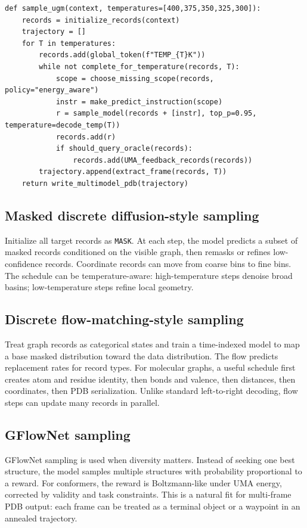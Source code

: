 \documentclass[11pt]{article}
\newcommand{\1}{\mathbf{1}}
\begin{document}
\begin{lstlisting}[caption={Annealed random-order sampler.}]
def sample_ugm(context, temperatures=[400,375,350,325,300]):
    records = initialize_records(context)
    trajectory = []
    for T in temperatures:
        records.add(global_token(f"TEMP_{T}K"))
        while not complete_for_temperature(records, T):
            scope = choose_missing_scope(records, policy="energy_aware")
            instr = make_predict_instruction(scope)
            r = sample_model(records + [instr], top_p=0.95, temperature=decode_temp(T))
            records.add(r)
            if should_query_oracle(records):
                records.add(UMA_feedback_records(records))
        trajectory.append(extract_frame(records, T))
    return write_multimodel_pdb(trajectory)
\end{lstlisting}

\subsection{Masked discrete diffusion-style sampling}

Initialize all target records as \texttt{MASK}. At each step, the model predicts a subset of masked records conditioned on the visible graph, then remasks or refines low-confidence records. Coordinate records can move from coarse bins to fine bins. The schedule can be temperature-aware: high-temperature steps denoise broad basins; low-temperature steps refine local geometry.

\subsection{Discrete flow-matching-style sampling}

Treat graph records as categorical states and train a time-indexed model to map a base masked distribution toward the data distribution. The flow predicts replacement rates for record types. For molecular graphs, a useful schedule first creates atom and residue identity, then bonds and valence, then distances, then coordinates, then PDB serialization. Unlike standard left-to-right decoding, flow steps can update many records in parallel.

\subsection{GFlowNet sampling}

GFlowNet sampling is used when diversity matters. Instead of seeking one best structure, the model samples multiple structures with probability proportional to a reward. For conformers, the reward is Boltzmann-like under UMA energy, corrected by validity and task constraints. This is a natural fit for multi-frame PDB output: each frame can be treated as a terminal object or a waypoint in an annealed trajectory.
\end{document}
